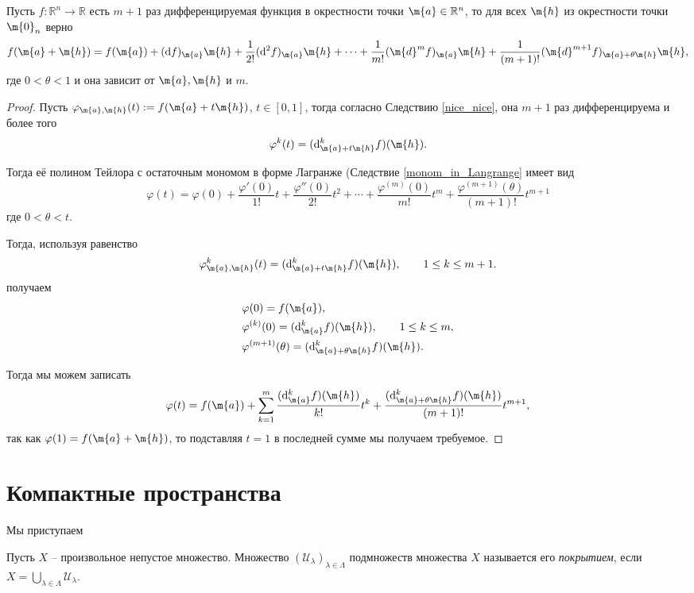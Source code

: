 \begin{theorem}\label{Taylor_in_many}
    Пусть $f:\mathbb{R}^n \to \mathbb{R}$ есть $m+1$ раз дифференцируемая функция в окрестности точки $\m{a} \in \mathbb{R}^n$, то для всех $\m{h}$ из окрестности точки $\m{0}_n$ верно 
    \[
     f(\m{a} + \m{h}) = f(\m{a}) + (\mathrm{d}f)_\m{a} \m{h} + \frac{1}{2!} (\mathrm{d}^2f)_\m{a}\m{h} + \cdots + \frac{1}{m!} (\m{d}^mf)_\m{a}\m{h} + \frac{1}{(m+1)!} (\m{d}^{m+1}f)_{\m{a}+ \theta \m{h}}\m{h},
    \]
    где $0 < \theta < 1$ и она зависит от $\m{a}, \m{h}$ и $m$.
\end{theorem}
\begin{proof}
    Пусть $\varphi_{\m{a},\m{h}}(t): = f(\m{a}+t \m{h})$, $t \in [0,1]$, тогда согласно Следствию \ref{nice_nice}, она $m+1$ раз дифференцируема и более того 
    \[
     \varphi^{k}(t) = (\mathrm{d}^k_{\m{a}+t\m{h}}f)(\m{h}).
    \]

Тогда её полином Тейлора с остаточным мономом в форме Лагранже (Следствие \ref{monom_in_Langrange} имеет вид
\[
 \varphi(t) = \varphi(0) + \frac{\varphi'(0)}{1!}t + \frac{\varphi''(0)}{2!}t^2 + \cdots + \frac{\varphi^{(m)}(0)}{m!}t^m + \frac{\varphi^{(m+1)}(\theta)}{(m+1)!}t^{m+1}
\]
где $0 < \theta < t.$

Тогда, используя равенство 
 \[
     \varphi_{\m{a},\m{h}}^{k}(t) = (\mathrm{d}^k_{\m{a}+t\m{h}}f)(\m{h}), \qquad 1 \le k \le m+1.
    \]
    получаем
\begin{align*}
    &\varphi(0) = f(\m{a}), \\
    &\varphi^{(k)}(0) = (\mathrm{d}^k_{\m{a}}f)(\m{h}), \qquad 1 \le k \le m,\\
    &\varphi^{(m+1)}(\theta) =(\mathrm{d}^k_{\m{a}+\theta \m{h}}f)(\m{h}).
\end{align*}

Тогда мы можем записать
\[
 \varphi(t) = f(\m{a}) + \sum_{k=1}^m \frac{(\mathrm{d}^k_{\m{a}}f)(\m{h})}{k!}t^k + \frac{( \mathrm{d}^k_{\m{a}+\theta \m{h}}f)(\m{h}) }{(m+1)!}t^{m+1},
\]
так как $\varphi(1) = f(\m{a}+\m{h})$, то подставляя $t=1$ в последней сумме мы получаем требуемое.
 \end{proof}




\section{Компактные пространства}

Мы приступаем 

\begin{definition}
 Пусть $X$ -- произвольное непустое множество. Множество $(\mathscr{U}_\lambda)_{\lambda \in \Lambda}$ подмножеств множества $X$ называется его \textit{покрытием}, если $X = \bigcup_{\lambda \in \Lambda} \mathscr{U}_\lambda$.    
\end{definition}

